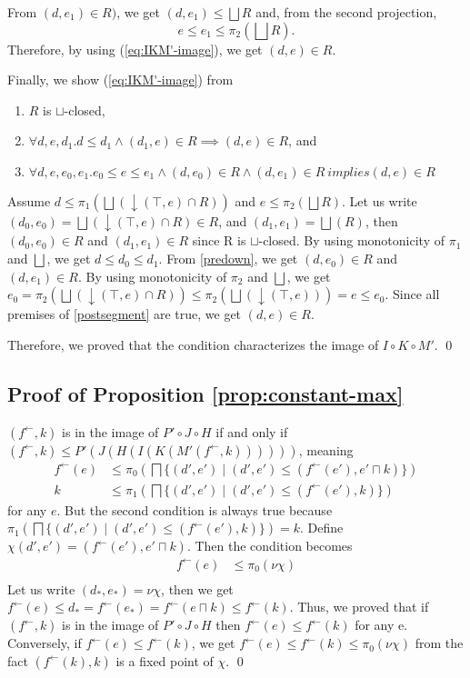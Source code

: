 \documentclass{llncs}
\newcommand{\fb}{{f^{\leftarrow}}}
\newcommand{\join}{\sqcup}
\newcommand{\bigjoin}{\bigsqcup}
\newcommand{\meet}{\sqcap}
\newcommand{\bigmeet}{\bigsqcap}
\newcommand{\comp}{\circ}
\begin{document}
From $(d, e_{1}) \in R)$, we get $(d , e_{1}) \leq \bigjoin R$ and, from the second projection,
\[
  e \leq e_{1} \leq \pi_{2} (\bigjoin R).
\]
Therefore, by using (\ref{eq:IKM'-image}), we get $(d, e) \in R$.

Finally, we show (\ref{eq:IKM'-image}) from
\begin{enumerate}[i]
  \item $R$ is $\join$-closed,
  \item $\forall d, e , d_{1}. d \leq d_{1} \land (d_{1} , e) \in R \implies (d , e) \in R$, and \label{predown}
  \item $\forall d, e , e_{0}, e_{1}. e_{0} \leq e \leq e_{1} \land (d , e_{0}) \in R \land (d , e_{1}) \in R \ implies (d , e) \in R$ \label{postsegment}
\end{enumerate}
Assume $d \leq \pi_{1} (\bigjoin (\downarrow (\top , e) \cap R))$ and $e \leq \pi_{2} (\bigjoin R)$.
Let us write $(d_{0} , e_{0}) = \bigjoin (\downarrow (\top , e) \cap R) \in R$, and $(d_{1} , e_{1}) = \bigjoin (R)$,
then $(d_{0}, e_{0}) \in R$ and $(d_{1}, e_{1}) \in R$ since R is $\join$-closed.
By using monotonicity of $\pi_{1}$ and $\bigjoin$, we get $d \leq d_{0} \leq d_{1}$.
From \ref{predown}, we get $(d, e_{0}) \in R$ and $(d, e_{1}) \in R$.
By using monotonicity of $\pi_{2}$ and $\bigjoin$, we get
$ e_{0} = \pi_{2} (\bigjoin (\downarrow (\top , e) \cap R)) \leq  \pi_{2} (\bigjoin (\downarrow (\top , e))) = e \leq e_{0}$.
Since all premises of \ref{postsegment} are true, we get $(d, e) \in R$.

Therefore, we proved that the condition characterizes the image of $I \comp K \comp M'$. \qed


\subsection{Proof of Proposition \ref{prop:constant-max}}
$(\fb, k)$ is in the image of $P' \comp J \comp H$ if and only if $(\fb, k) \leq P'(J(H(I(K(M'(\fb , k))))))$, meaning
\begin{align*}
  \fb(e) &\leq \pi_{0} (\bigmeet \{(d' , e') \mid (d' , e') \leq (\fb(e'), e' \meet k) \}) \\
  k &\leq \pi_{1} (\bigmeet \{(d' , e') \mid (d' , e') \leq (\fb(e'), k) \})
\end{align*}
for any $e$. But the second condition is always true because $\pi_{1} (\bigmeet \{(d' , e') \mid (d' , e') \leq (\fb(e'), k) \}) = k$.
Define $\chi(d', e') = (\fb(e') , e' \meet k)$.
Then the condition becomes
\begin{align*}
  \fb(e) &\leq \pi_{0} (\nu \chi) \\
\end{align*}
Let us write $(d_{*} , e_{*}) = \nu \chi$, then we get
$\fb(e) \leq d_{*} = \fb(e_{*}) = \fb(e \meet k) \leq \fb(k)$.
Thus, we proved that if $(\fb, k)$ is in the image of $P' \comp J \comp H$ then $\fb(e) \leq \fb(k)$ for any e.
Conversely, if $\fb(e) \leq \fb(k)$, we get $\fb(e) \leq \fb(k) \leq \pi_{0} (\nu \chi)$ from the fact $(\fb(k) , k)$ is a fixed point of $\chi$. \qed
\end{document}
